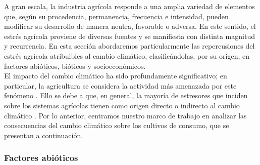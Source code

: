 A gran escala, la industria agrícola responde a una amplia variedad de elementos que, según su procedencia, permanencia, frecuencia e intensidad, pueden modificar su desarrollo de manera neutra, favorable o adversa. En este sentido, el estrés agrícola proviene de diversas fuentes y se manifiesta con distinta magnitud y recurrencia. En esta sección abordaremos particularmente las repercusiones del estrés agrícola atribuibles al cambio climático, clasificándolas, por su origen, en factores abióticos, bióticos y socioeconómicos.\\

El impacto del cambio climático ha sido profundamente significativo; en particular, la agricultura se considera la actividad más amenazada por este fenómeno \cite{Boyer_1982, Raza_2019}. Ello se debe a que, en general, la mayoría de estresores que inciden sobre los sistemas agrícolas tienen como origen directo o indirecto al cambio climático \cite{Olschewski_2024, Raza_2019, Surowka_2020}. Por lo anterior, centramos nuestro marco de trabajo en analizar las consecuencias del cambio climático sobre los cultivos de consumo, que se presentan a continuación.

\subsubsection{Factores abióticos\\}

